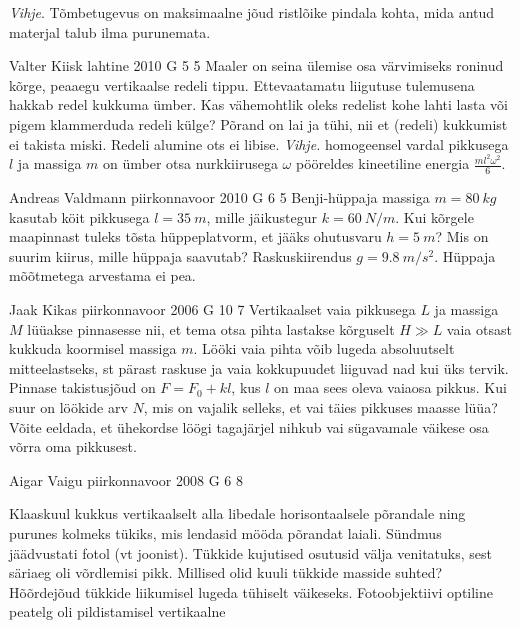 \documentclass[11pt]{article}
\begin{document}
{{\emph{Vihje}. Tõmbetugevus on maksimaalne jõud ristlõike pindala kohta, mida antud materjal talub ilma purunemata.
\fi
}

{Valter Kiisk} %
{lahtine} %
{2010} %
{G 5} %
{5} %
{
\ifStatement
Maaler on seina ülemise osa värvimiseks roninud kõrge, peaaegu vertikaalse
redeli tippu. Ettevaatamatu liigutuse tulemusena hakkab redel kukkuma ümber. Kas
vähemohtlik oleks redelist kohe lahti lasta või pigem klammerduda redeli külge?
Põrand on lai ja tühi, nii et (redeli) kukkumist ei takista miski. Redeli alumine
ots ei libise.
\emph{Vihje.} homogeensel vardal pikkusega $l$ ja massiga $m$ on ümber otsa
nurkkiirusega $\omega$ pööreldes kineetiline energia $\frac{m l^2 \omega^2}{6}$.
\fi
}

{Andreas Valdmann} %
{piirkonnavoor} %
{2010} %
{G 6} %
{5} %
{
\ifStatement
Benji-hüppaja massiga $m=\SI{80}{kg}$ kasutab köit pikkusega $l=\SI{35}{m}$, mille jäikustegur $k=\SI{60}{N/m}$. Kui kõrgele maapinnast tuleks tõsta hüppeplatvorm, et jääks ohutusvaru $h=\SI{5}{m}$? Mis on suurim kiirus, mille hüppaja saavutab? Raskuskiirendus $g=\SI{9.8}{m/s^2}$. Hüppaja mõõtmetega arvestama ei pea. 
\fi
}

{Jaak Kikas} %
{piirkonnavoor} %
{2006} %
{G 10} %
{7} %
{
\ifStatement
Vertikaalset vaia pikkusega $L$ ja massiga $M$ lüüakse pinnasesse nii, et tema otsa pihta lastakse kõrguselt $H\gg L$ vaia otsast kukkuda koormisel massiga $m$. Lööki vaia pihta võib lugeda absoluutselt mitteelastseks, st pärast raskuse ja vaia kokkupuudet liiguvad nad kui üks tervik. Pinnase takistusjõud on $F = F_0 + kl$, kus $l$ on maa sees oleva vaiaosa pikkus. Kui suur on löökide arv $N$, mis on vajalik selleks, et vai täies pikkuses maasse lüüa? Võite eeldada, et ühekordse löögi tagajärjel nihkub vai sügavamale väikese osa võrra oma pikkusest.
\fi
}

{Aigar Vaigu} %
{piirkonnavoor} %
{2008} %
{G 6} %
{8} %
{
\ifStatement
Klaaskuul kukkus vertikaalselt alla libedale horisontaalsele põrandale ning purunes kolmeks tükiks, mis lendasid mööda põrandat laiali. Sündmus jäädvustati fotol (vt joonist). Tükkide kujutised osutusid välja venitatuks, sest säriaeg oli võrdlemisi pikk. Millised olid kuuli tükkide masside suhted? Hõõrdejõud tükkide liikumisel lugeda tühiselt väikeseks. Fotoobjektiivi optiline peatelg oli pildistamisel vertikaalne

}}
\end{document}
